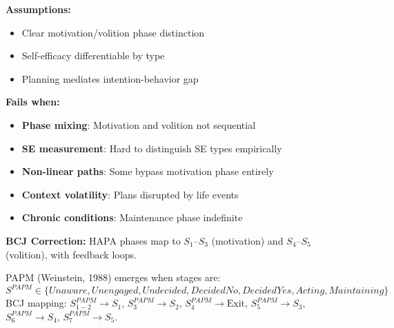 \begin{tcolorbox}[colback=red!5!white, colframe=red!75!black, title=Boundary Condition: Where HAPA Fails]
\textbf{Assumptions:}
\begin{itemize}[nosep]
\item Clear motivation/volition phase distinction
\item Self-efficacy differentiable by type
\item Planning mediates intention-behavior gap
\end{itemize}

\textbf{Fails when:}
\begin{itemize}[nosep]
\item \textbf{Phase mixing}: Motivation and volition not sequential
\item \textbf{SE measurement}: Hard to distinguish SE types empirically
\item \textbf{Non-linear paths}: Some bypass motivation phase entirely
\item \textbf{Context volatility}: Plans disrupted by life events
\item \textbf{Chronic conditions}: Maintenance phase indefinite
\end{itemize}

\textbf{BCJ Correction:} HAPA phases map to $S_1$--$S_3$ (motivation) and $S_4$--$S_5$ (volition), with feedback loops.
\end{tcolorbox}


\begin{theorem}
\label{thm:papm}
PAPM (Weinstein, 1988) emerges when stages are:
\begin{equation}
\boxed{S^{PAPM} \in \{Unaware, Unengaged, Undecided, Decided No, Decided Yes, Acting, Maintaining\}}
\end{equation}
BCJ mapping: $S^{PAPM}_{1-2} \to S_1$, $S^{PAPM}_{3} \to S_2$, $S^{PAPM}_{4} \to \text{Exit}$, $S^{PAPM}_{5} \to S_3$, $S^{PAPM}_{6} \to S_4$, $S^{PAPM}_{7} \to S_5$.
\end{theorem}

